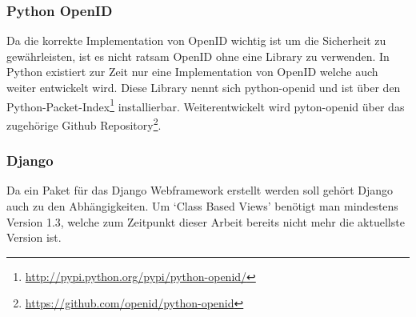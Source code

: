 \subsubsection{Python OpenID}
\label{ssub:Python OpenID}
Da die korrekte Implementation von OpenID wichtig ist um die Sicherheit zu
gewährleisten, ist es nicht ratsam OpenID ohne eine Library zu verwenden. In
Python existiert zur Zeit nur eine Implementation von OpenID welche auch weiter
entwickelt wird. Diese Library nennt sich python-openid und ist über den
Python-Packet-Index\footnote{\url{http://pypi.python.org/pypi/python-openid/}}
installierbar. Weiterentwickelt wird pyton-openid über das zugehörige Github
Repository\footnote{\url{https://github.com/openid/python-openid}}.

\subsubsection{Django}
\label{ssub:Django}
Da ein Paket für das Django Webframework erstellt werden soll gehört Django
auch zu den Abhängigkeiten. Um `Class Based Views' benötigt man mindestens
Version 1.3, welche zum Zeitpunkt dieser Arbeit bereits nicht mehr die
aktuellste Version ist.
